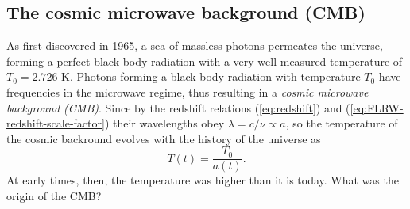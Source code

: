 \subsection{The cosmic microwave background (CMB)}
As first discovered in 1965, a sea of massless photons permeates the universe, forming a perfect black-body radiation with a very well-measured temperature of $T_0 = 2.726$ K. \cite[4]{Dodelson-Schmidt-2025}
Photons forming a black-body radiation with temperature $T_0$ have frequencies in the microwave regime, thus resulting in a \emph{cosmic microwave background (CMB)}. Since by the redshift relations (\ref{eq:redshift}) and (\ref{eq:FLRW-redshift-scale-factor}) their wavelengths obey $\lambda = c/\nu \propto a$, so the temperature of the cosmic backround evolves with the history of the universe as
\begin{equation}
	T(t)
	= \frac{T_0}{a(t)}
	.
	\label{eq:FLRW-temperature-scale-factor}
\end{equation}
At early times, then, the temperature was higher than it is today.
What was the origin of the CMB?


